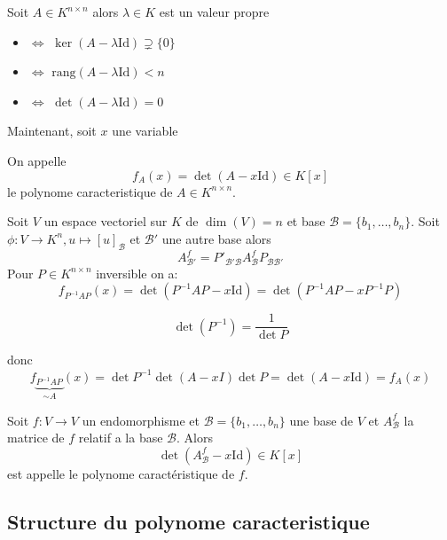Soit  $A\in K^{n\times n}$ alors $\lambda \in K$ est un valeur propre
\begin{itemize}
\item $\Leftrightarrow$ $\ker (A-\lambda \mathrm{Id})\supsetneq \{ 0 \}$
\item $\Leftrightarrow$ $\mathrm{rang}(A-\lambda \mathrm{Id})<n$
\item $\Leftrightarrow$ $\det(A-\lambda \mathrm{Id})=0$
\end{itemize}

Maintenant, soit $x$ une variable 
\begin{definition}
On appelle
$$
f_{A}(x)=\det(A-x\mathrm{Id})\in K[x]
$$
le polynome caracteristique de $A\in K^{n\times n}$.
\end{definition}

Soit $V$ un espace vectoriel sur $K$ de $\dim(V)=n$ et base $\mathscr{B}=\{ b_{1},\dots,b_{n} \}$. Soit $\phi:V\to K^{n},u\mapsto[u]_{\mathscr{B}}$ et $\mathscr{B}'$ une autre base alors
$$
A_{\mathscr{B}'}^{f}=P'_{\mathscr{B}'\mathscr{B}}A_{\mathscr{B}}^{f}P_{\mathscr{B}\mathscr{B}'}
$$
Pour $P\in K^{n\times n}$ inversible on a:
$$
f_{P^{-1}AP}(x)=\det(P^{-1}AP-x\mathrm{Id})=\det(P^{-1}AP-xP^{-1}P)
$$
\begin{reminder}
$$
\det(P^{-1})=\frac{1}{\det P}
$$
\end{reminder}
donc
$$
f\underbrace{ _{P^{-1}AP} }_{ \sim A }(x)=\det P^{-1}\det(A-xI)\det P=\det(A-x\mathrm{Id})=f_{A}(x)
$$

\begin{definition}
Soit $f:V\to V$ un endomorphisme et $\mathscr{B}=\{ b_{1},\dots,b_{n} \}$ une base de $V$ et $A_{\mathscr{B}}^{f}$ la matrice de $f$ relatif a la base $\mathscr{B}$. Alors
$$
\det(A_{\mathscr{B}}^{f}-x\mathrm{Id})\in K[x]
$$
est appelle le polynome caractéristique de $f$.
\end{definition}

\subsection{Structure du polynome caracteristique}

